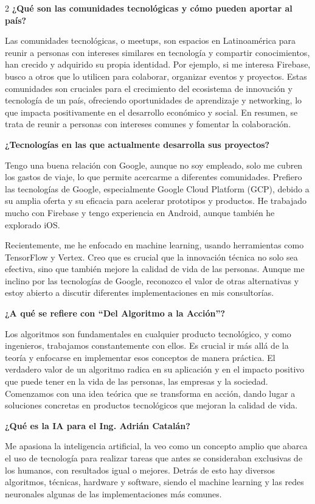 \documentclass[12pt,spanish,Letterpaper,openany]{book}
\begin{document}
\begin {multicols}{2}
\textbf{¿Qué son las comunidades tecnológicas y cómo pueden aportar al país?}

Las comunidades tecnológicas, o meetups, son espacios en Latinoamérica para reunir a personas con intereses similares en tecnología y compartir conocimientos, han crecido y adquirido su propia identidad. Por ejemplo, si me interesa Firebase, busco a otros que lo utilicen para colaborar, organizar eventos y proyectos. Estas comunidades son cruciales para el crecimiento del ecosistema de innovación y tecnología de un país, ofreciendo oportunidades de aprendizaje y networking, lo que impacta positivamente en el desarrollo económico y social. En resumen, se trata de reunir a personas con intereses comunes y fomentar la colaboración.

\textbf{¿Tecnologías en las que actualmente desarrolla sus proyectos?}

Tengo una buena relación con Google, aunque no soy empleado, solo me cubren los gastos de viaje, lo que permite acercarme a diferentes comunidades. Prefiero las tecnologías de Google, especialmente Google Cloud Platform (GCP), debido a su amplia oferta y su eficacia para acelerar prototipos y productos. He trabajado mucho con Firebase y tengo experiencia en Android, aunque también he explorado iOS.

Recientemente, me he enfocado en machine learning, usando herramientas como TensorFlow y Vertex. Creo que es crucial que la innovación técnica no solo sea efectiva, sino que también mejore la calidad de vida de las personas. Aunque me inclino por las tecnologías de Google, reconozco el valor de otras alternativas y estoy abierto a discutir diferentes implementaciones en mis consultorías.

\textbf{¿A qué se refiere con ``Del Algoritmo a la Acción''?}

Los algoritmos son fundamentales en cualquier producto tecnológico, y como ingenieros, trabajamos constantemente con ellos. Es crucial ir más allá de la teoría y enfocarse en implementar esos conceptos de manera práctica. El verdadero valor de un algoritmo radica en su aplicación y en el impacto positivo que puede tener en la vida de las personas, las empresas y la sociedad. Comenzamos con una idea teórica que se transforma en acción, dando lugar a soluciones concretas en productos tecnológicos que mejoran la calidad de vida.

\textbf{¿Qué es la IA para el Ing. Adrián Catalán?}

Me apasiona la inteligencia artificial, la veo como un concepto amplio que abarca el uso de tecnología para realizar tareas que antes se consideraban exclusivas de los humanos, con resultados igual o mejores. Detrás de esto hay diversos algoritmos, técnicas, hardware y software, siendo el machine learning y las redes neuronales algunas de las implementaciones más comunes.


\end{multicols}
\end{document}
